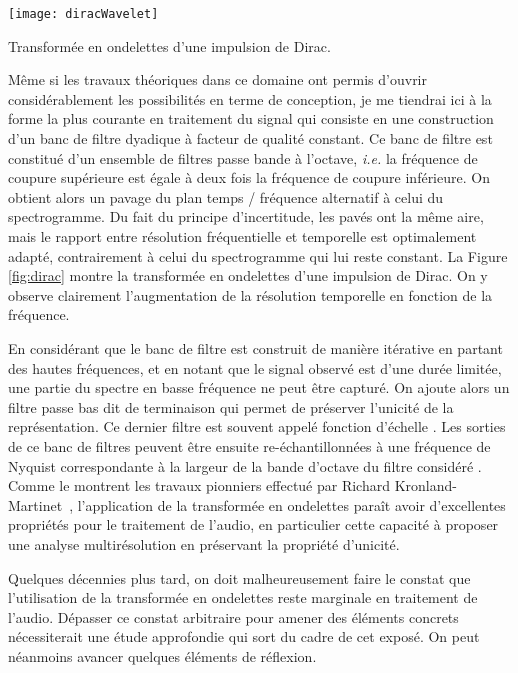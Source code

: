 \begin{marginfigure}
  \texttt{[image: diracWavelet]}
  \caption{Transformée en ondelettes d'une impulsion de Dirac.}
  \label{fig:dirac}
\end{marginfigure}

Même si les travaux théoriques dans ce domaine ont permis d'ouvrir considérablement les possibilités en terme de conception, je me  tiendrai ici à la forme la plus courante en traitement du signal qui consiste en une construction d'un banc de filtre dyadique à facteur de qualité constant. Ce banc de filtre est constitué d'un ensemble de filtres passe bande à l'octave, \textit{i.e.} la fréquence de coupure supérieure est égale à deux fois la fréquence de coupure inférieure. On obtient alors un pavage du plan temps / fréquence alternatif à celui du spectrogramme. Du fait du principe d'incertitude, les pavés ont la même aire, mais le rapport entre résolution fréquentielle et temporelle est optimalement adapté, contrairement à celui du spectrogramme qui lui reste constant. La Figure \ref{fig:dirac} montre la transformée en ondelettes d'une impulsion de Dirac. On y  observe clairement l'augmentation de la résolution temporelle en fonction de la fréquence.

En considérant que le banc de filtre est construit de manière itérative en partant des hautes fréquences, et en notant que le signal observé est d'une durée limitée, une partie du spectre en basse fréquence ne peut être capturé. On ajoute alors un filtre passe bas dit \og de terminaison \fg qui permet de préserver l'unicité de la représentation. Ce dernier filtre est souvent appelé \og fonction d'échelle \fg. Les sorties de ce banc de filtres peuvent être ensuite re-échantillonnées à une fréquence de Nyquist correspondante à la largeur de la bande d'octave du filtre considéré%
. Comme le montrent les travaux pionniers effectué par Richard Kronland-Martinet~\cite{kronland1987analysis}, l'application de la transformée en ondelettes paraît avoir d'excellentes propriétés pour le traitement de l'audio, en particulier cette capacité à proposer une analyse multirésolution en préservant la propriété d'unicité.


Quelques décennies plus tard, on doit malheureusement faire le constat que l'utilisation de la transformée en ondelettes reste marginale en traitement de l'audio. Dépasser ce constat arbitraire pour amener des éléments concrets nécessiterait une étude approfondie qui sort du cadre de cet exposé. On peut néanmoins avancer quelques éléments de réflexion.

